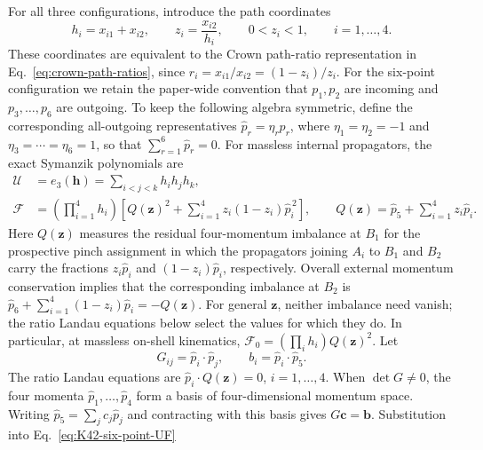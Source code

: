 \documentclass[a4paper,11pt]{article}
\begin{document}
For all three configurations, introduce the path coordinates
\begin{equation}
 h_i=x_{i1}+x_{i2},\qquad
 z_i=\frac{x_{i2}}{h_i},\qquad 0<z_i<1,
 \qquad i=1,\ldots,4.
 \label{eq:K42-path-coordinates}
\end{equation}
These coordinates are equivalent to the Crown path-ratio representation in
Eq.~\eqref{eq:crown-path-ratios}, since
\(r_i=x_{i1}/x_{i2}=(1-z_i)/z_i\).
For the six-point configuration we retain the paper-wide convention that
\(p_1,p_2\) are incoming and \(p_3,\ldots,p_6\) are outgoing.  To keep the
following algebra symmetric, define the corresponding all-outgoing
representatives \(\widehat p_r=\eta_r p_r\), where
\(\eta_1=\eta_2=-1\) and \(\eta_3=\cdots=\eta_6=1\), so that
\(\sum_{r=1}^6\widehat p_r=0\).
For massless internal propagators, the exact Symanzik polynomials are
\begin{align}
 \mathcal U&=e_3(\boldsymbol h)
 =\sum_{i<j<k}h_i h_j h_k,\nonumber\\
 \mathcal F&=\left(\prod_{i=1}^4h_i\right)
 \left[
   Q(\boldsymbol z)^2
   +\sum_{i=1}^4z_i(1-z_i)\widehat p_i^{\,2}
 \right],
 \qquad
 Q(\boldsymbol z)=\widehat p_5+\sum_{i=1}^4z_i\widehat p_i .
 \label{eq:K42-six-point-UF}
\end{align}
Here \(Q(\boldsymbol z)\) measures the residual four-momentum imbalance at
\(B_1\) for the prospective pinch assignment in which the propagators joining
\(A_i\) to \(B_1\) and \(B_2\) carry the fractions \(z_i\widehat p_i\) and
\((1-z_i)\widehat p_i\), respectively.  Overall external momentum conservation
implies that the corresponding imbalance at \(B_2\) is
\(\widehat p_6+\sum_{i=1}^4(1-z_i)\widehat p_i=-Q(\boldsymbol z)\).
For general \(\boldsymbol z\), neither imbalance need vanish; the ratio Landau
equations below select the values for which they do.  In particular, at
massless on-shell kinematics,
\(\mathcal F_0=(\prod_i h_i)Q(\boldsymbol z)^2\).  Let
\begin{equation}
 G_{ij}=\widehat p_i\mathbin{\cdot}\widehat p_j,\qquad
 b_i=\widehat p_i\mathbin{\cdot}\widehat p_5 .
 \label{eq:K42-six-point-Gram-data}
\end{equation}
\newpage
The ratio Landau equations are
\(\widehat p_i\mathbin{\cdot}Q(\boldsymbol z)=0\), \(i=1,\ldots,4\).
When \(\det G\ne0\), the four momenta \(\widehat p_1,\ldots,
\widehat p_4\) form a basis of four-dimensional momentum space.  Writing
\(\widehat p_5=\sum_jc_j\widehat p_j\) and contracting with this basis gives
\(G\boldsymbol c=\boldsymbol b\).  Substitution into Eq.~\eqref{eq:K42-six-point-UF}
\end{document}
